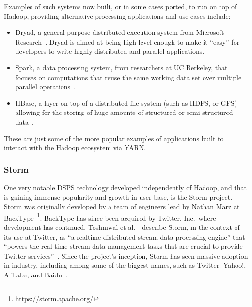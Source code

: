 \documentclass[a4paper,11pt]{article}
\begin{document}
Examples of such systems now built, or in some cases ported, to run on top of Hadoop, providing alternative processing
applications and use cases include:

\begin{itemize}
  \item Dryad, a general-purpose distributed execution system from Microsoft Research~\cite{isard2007dryad}. Dryad is
  aimed at being high level enough to make it ``easy'' for developers to write highly distributed and parallel applications.
  \item Spark, a data processing system, from researchers at UC Berkeley, that focuses on computations that reuse the same working data set over multiple
  parallel operations~\cite{zaharia2010spark}.
  \item HBase, a layer on top of a distributed file system (such as HDFS, or GFS) allowing for the storing of huge
  amounts of structured or semi-structured data~\cite{khetrapal2006hbase}.
\end{itemize}

These are just some of the more popular examples of applications built to interact with the Hadoop ecosystem via YARN.



\subsubsection{Storm} %
\label{ssub:storm}

One very notable DSPS technology developed independently of Hadoop, and that is gaining immense popularity and growth in
user base, is the Storm project. Storm was originally developed by a team of engineers lead by Nathan Marz at
BackType~\footnote{https://storm.apache.org/}. BackType has since been acquired by Twitter, Inc.\ where development has
continued. Toshniwal et al.~\cite{toshniwal2014storm}\ describe Storm, in the context of its use at Twitter, as ``a
realtime distributed stream data processing engine'' that ``powers the real-time stream data management tasks that are
crucial to provide Twitter services''~\cite[p.\ 147]{toshniwal2014storm}. Since the project's inception, Storm has seen massive
adoption in industry, including among some of the biggest names, such as Twitter, Yahoo!, Alibaba, and
Baidu~\cite{storm_users}.


\end{document}
